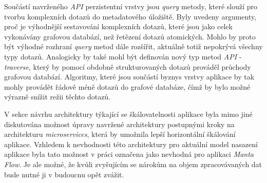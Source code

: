 Součástí navrženého \textit{API} perzistentní vrstvy jsou \textit{query} metody, které slouží pro tvorbu komplexních dotazů do metadatového úložiště. Byly uvedeny argumenty, proč je výhodnější sestavování komplexních dotazů, které jsou jako celek vykonávány grafovou databází, než řetězení dotazů atomických. Mohlo by proto být výhodné rozhraní \textit{query} metod dále rozšířit, aktuálně totiž nepokrývá všechny typy dotazů. Analogicky by také mohl být definován nový typ metod \textit{API} - \textit{traverse}, který by pomocí obdobně strukturovaných dotazů prováděl průchody grafovou databází. Algoritmy, které jsou součástí byznys vrstvy aplikace by tak mohly provádět řádově méně dotazů do grafové databáze, čímž by bylo možné výrazně snížit režii těchto dotazů.

V sekce návrhu architektury týkající se škálovatelnosti aplikace byla mimo jiné diskutována možnost úpravy navržené architektury postupnými kroky na architekturu \textit{microservices}, která by umožnila lepší horizontální škálování aplikace. Vzhledem k nevhodnosti této architektury pro aktuální model nasazení aplikace byla tato možnost v práci označena jako nevhodná pro aplikaci \textit{Manta Flow}. Je ale možné, že kvůli zvyšujícím se nárokům na objem zpracovávaných dat bude nutné ji v budoucnu opět zvážit.
